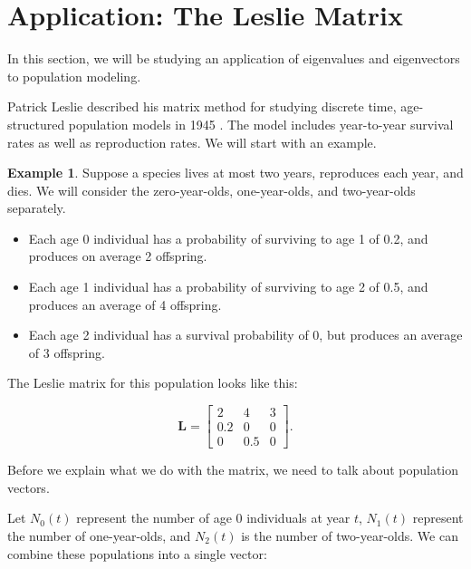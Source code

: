 \documentclass[
]{book}
\theoremstyle{definition}
\theoremstyle{definition}
\newtheorem{example}{Example}[chapter]
\theoremstyle{definition}
\theoremstyle{definition}
\theoremstyle{remark}
\begin{document}
\section{Application: The Leslie Matrix}\label{application-the-leslie-matrix}

In this section, we will be studying an application of eigenvalues and eigenvectors to population modeling.

Patrick Leslie described his matrix method for studying discrete time, age-structured population models in 1945 \autocite{Leslie}. The model includes year-to-year survival rates as well as reproduction rates. We will start with an example.

\begin{examplebox}

\begin{example}
\protect\hypertarget{exm:Leslie1}{}\label{exm:Leslie1}Suppose a species lives at most two years, reproduces each year, and dies. We will consider the zero-year-olds, one-year-olds, and two-year-olds separately.

\begin{itemize}
\item
  Each age 0 individual has a probability of surviving to age 1 of 0.2, and produces on average 2 offspring.
\item
  Each age 1 individual has a probability of surviving to age 2 of 0.5, and produces an average of 4 offspring.
\item
  Each age 2 individual has a survival probability of 0, but produces an average of 3 offspring.
\end{itemize}

The Leslie matrix for this population looks like this:

\[\mathbf{L}=\begin{bmatrix} 2 & 4 & 3\\
0.2 & 0 & 0\\ 0 & 0.5 & 0\end{bmatrix}.\]
\end{example}

\end{examplebox}

Before we explain what we do with the matrix, we need to talk about population vectors.

Let \(N_0(t)\) represent the number of age 0 individuals at year \(t\), \(N_1(t)\) represent the number of one-year-olds, and \(N_2(t)\) is the number of two-year-olds. We can combine these populations into a single vector:
\end{document}
